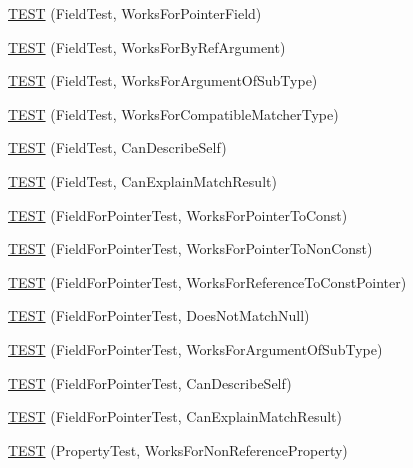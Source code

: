 \begin{DoxyCompactItemize}
\hyperlink{namespacetesting_1_1gmock__matchers__test_a56b1c75b98aaa5c9d3a6dec2d3ba30dc}{T\+E\+ST} (Field\+Test, Works\+For\+Pointer\+Field)
\item 
\hyperlink{namespacetesting_1_1gmock__matchers__test_afcb890c159493e250477408a453b08d1}{T\+E\+ST} (Field\+Test, Works\+For\+By\+Ref\+Argument)
\item 
\hyperlink{namespacetesting_1_1gmock__matchers__test_ae720452c3587433e26bea2ea7e91f8e6}{T\+E\+ST} (Field\+Test, Works\+For\+Argument\+Of\+Sub\+Type)
\item 
\hyperlink{namespacetesting_1_1gmock__matchers__test_a27058ed7297742f08419bc5feb3ef687}{T\+E\+ST} (Field\+Test, Works\+For\+Compatible\+Matcher\+Type)
\item 
\hyperlink{namespacetesting_1_1gmock__matchers__test_ac43583cb3c4221aa6bd0132c2cb3fed6}{T\+E\+ST} (Field\+Test, Can\+Describe\+Self)
\item 
\hyperlink{namespacetesting_1_1gmock__matchers__test_ae1279ce8e2a3a6c6f0d4dbe436c9da02}{T\+E\+ST} (Field\+Test, Can\+Explain\+Match\+Result)
\item 
\hyperlink{namespacetesting_1_1gmock__matchers__test_af5c12cdd12f8778074ad0714b83858ed}{T\+E\+ST} (Field\+For\+Pointer\+Test, Works\+For\+Pointer\+To\+Const)
\item 
\hyperlink{namespacetesting_1_1gmock__matchers__test_ac339a26bf6100a2eb2dd4bf908f8448c}{T\+E\+ST} (Field\+For\+Pointer\+Test, Works\+For\+Pointer\+To\+Non\+Const)
\item 
\hyperlink{namespacetesting_1_1gmock__matchers__test_a603253edc7a2310c8a1db225cb589a99}{T\+E\+ST} (Field\+For\+Pointer\+Test, Works\+For\+Reference\+To\+Const\+Pointer)
\item 
\hyperlink{namespacetesting_1_1gmock__matchers__test_a06a1c8d949707ab606627e9f6efe87b9}{T\+E\+ST} (Field\+For\+Pointer\+Test, Does\+Not\+Match\+Null)
\item 
\hyperlink{namespacetesting_1_1gmock__matchers__test_a5447541a290e16a81aec6dd975983d57}{T\+E\+ST} (Field\+For\+Pointer\+Test, Works\+For\+Argument\+Of\+Sub\+Type)
\item 
\hyperlink{namespacetesting_1_1gmock__matchers__test_a056670af8fc7bd3dfd170435dbf08c3c}{T\+E\+ST} (Field\+For\+Pointer\+Test, Can\+Describe\+Self)
\item 
\hyperlink{namespacetesting_1_1gmock__matchers__test_a6a4ffd283f91f4e085aa582aedefe38e}{T\+E\+ST} (Field\+For\+Pointer\+Test, Can\+Explain\+Match\+Result)
\item 
\hyperlink{namespacetesting_1_1gmock__matchers__test_a9c42c3b244c7b4d63040e469d5b31e1e}{T\+E\+ST} (Property\+Test, Works\+For\+Non\+Reference\+Property)

\end{DoxyCompactItemize}
